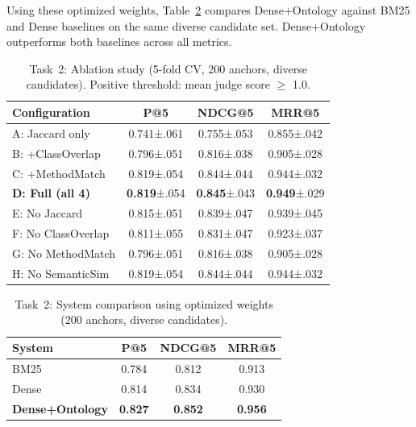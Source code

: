 Using these optimized weights, Table~\ref{tab:task2} compares Dense+Ontology against BM25 and Dense baselines on the same diverse candidate set. Dense+Ontology outperforms both baselines across all metrics.

\begin{table}[t]
\centering
\caption{Task~2: Ablation study (5-fold CV, 200 anchors, diverse candidates). Positive threshold: mean judge score $\geq$ 1.0.}
\label{tab:task2_ablation}
\small
\begin{tabular}{lccc}
\toprule
\textbf{Configuration} & \textbf{P@5} & \textbf{NDCG@5} & \textbf{MRR@5} \\
\midrule
A: Jaccard only              & 0.741{\scriptsize±.061} & 0.755{\scriptsize±.053} & 0.855{\scriptsize±.042} \\
B: +ClassOverlap             & 0.796{\scriptsize±.051} & 0.816{\scriptsize±.038} & 0.905{\scriptsize±.028} \\
C: +MethodMatch              & 0.819{\scriptsize±.054} & 0.844{\scriptsize±.044} & 0.944{\scriptsize±.032} \\
\textbf{D: Full (all 4)}     & \textbf{0.819}{\scriptsize±.054} & \textbf{0.845}{\scriptsize±.043} & \textbf{0.949}{\scriptsize±.029} \\
\midrule
E: No Jaccard                & 0.815{\scriptsize±.051} & 0.839{\scriptsize±.047} & 0.939{\scriptsize±.045} \\
F: No ClassOverlap           & 0.811{\scriptsize±.055} & 0.831{\scriptsize±.047} & 0.923{\scriptsize±.037} \\
G: No MethodMatch            & 0.796{\scriptsize±.051} & 0.816{\scriptsize±.038} & 0.905{\scriptsize±.028} \\
H: No SemanticSim            & 0.819{\scriptsize±.054} & 0.844{\scriptsize±.044} & 0.944{\scriptsize±.032} \\
\bottomrule
\end{tabular}
\end{table}

\begin{table}[t]
\centering
\caption{Task~2: System comparison using optimized weights (200 anchors, diverse candidates).}
\label{tab:task2}
\begin{tabular}{lccc}
\toprule
\textbf{System} & \textbf{P@5} & \textbf{NDCG@5} & \textbf{MRR@5} \\
\midrule
BM25            & 0.784 & 0.812 & 0.913 \\
Dense           & 0.814 & 0.834 & 0.930 \\
\textbf{Dense+Ontology}  & \textbf{0.827} & \textbf{0.852} & \textbf{0.956} \\
\bottomrule
\end{tabular}
\end{table}


